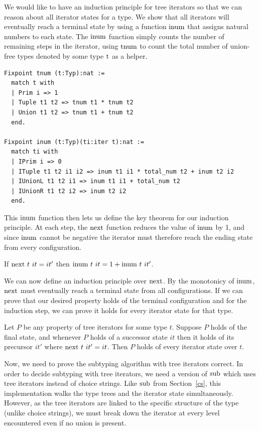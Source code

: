 \documentclass[a4paper,english]{lipics-v2019}
\renewcommand{\c}[1]{\ensuremath{\text{\lstinline{#1}}}\xspace}
\begin{document}
We would like to have an induction principle for tree iterators so that
we can reason about all iterator states for a type. We show that all iterators
will eventually reach a terminal state by using a function \c{inum} that assigns
natural numbers to each state. The \c{inum} function simply counts the number of
remaining steps in the iterator, using \c{tnum} to count the total number of union-free
types denoted by some type \c{t} as a helper.

\begin{lstlisting}
Fixpoint tnum (t:Typ):nat :=
  match t with
  | Prim i => 1
  | Tuple t1 t2 => tnum t1 * tnum t2
  | Union t1 t2 => tnum t1 + tnum t2
  end.

Fixpoint inum (t:Typ)(ti:iter t):nat :=
  match ti with
  | IPrim i => 0
  | ITuple t1 t2 i1 i2 => inum t1 i1 * total_num t2 + inum t2 i2
  | IUnionL t1 t2 i1 => inum t1 i1 + total_num t2
  | IUnionR t1 t2 i2 => inum t2 i2
  end.
\end{lstlisting}

This \c{inum} function then lets us define the key theorem for our
induction principle. At each step, the \c{next} function reduces the
value of \c{inum} by 1, and since \c{inum} cannot be negative the
iterator must therefore reach the ending state from every configuration.

\begin{lemma}\label{inum_mono}
If $\c{next}~t~it = it'$ then $\c{inum}~t~it = 1 + \c{inum}~t~it'$.
\end{lemma}

We can now define an induction principle over \c{next}. By the
monotonicy of \c{inum}, \c{next} must eventually reach a terminal state
from all configurations. If we can prove that our desired property holds
of the terminal configuration and for the induction step, we can prove it
holds for every iterator state for that type.

\begin{theorem}\label{indprop}
Let $P$ be any property of tree iterators for some type $t$.  Suppose $P$
holds of the final state, and whenever $P$ holds of a successor state $it$
then it holds of its precursor $it'$ where $\c{next}~t~it' = it$.  Then $P$
holds of every iterator state over $t$.
\end{theorem} 

Now, we need to prove the subtyping algorithm with tree iterators correct.
In order to decide subtyping with tree iterators, we need a version of \c{sub} which
uses tree iterators instead of choice strings. Like \c{sub} from Section~\ref{cs}, 
this implementation walks the type trees and the iterator state simultaneously. However,
as the tree iterators are linked to the specific structure of the type (unlike choice strings), 
we must break down the iterator at every level encountered even if no union is present.
\end{document}
